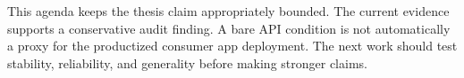 This agenda keeps the thesis claim appropriately bounded. The current evidence
supports a conservative audit finding. A bare API condition is not automatically
a proxy for the productized consumer app deployment. The next work should test
stability, reliability, and generality before making stronger claims.
